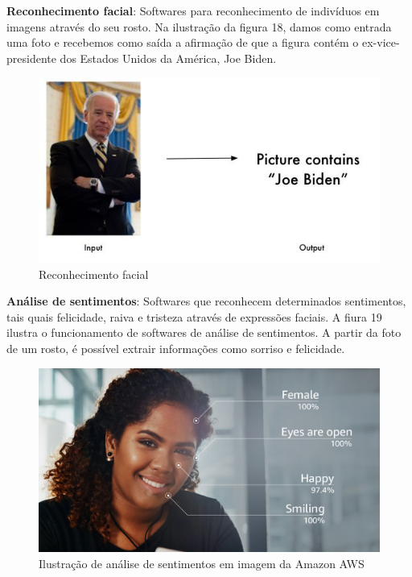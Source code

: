 \documentclass{article}
\begin{document}
\textbf{Reconhecimento facial}: Softwares para reconhecimento de indivíduos em imagens através do seu rosto. Na ilustração da figura 18, damos como entrada uma foto e recebemos como saída a afirmação de que a figura contém o ex-vice-presidente dos Estados Unidos da América, Joe Biden. \\
\begin{figure}[H]
    \centering
    \includegraphics[scale=0.5]{imagens/reconhecimento_facial.jpg}
    \caption{Reconhecimento facial}
    \label{fig:reconhecimento_facial}
\end{figure}{}
\textbf{Análise de sentimentos}: Softwares que reconhecem determinados sentimentos, tais quais felicidade, raiva e tristeza através de expressões faciais. A fiura 19 ilustra o funcionamento de softwares de análise de sentimentos. A partir da foto de um rosto, é possível extrair informações como sorriso e felicidade.\\
\begin{figure}[H]
    \centering
    \includegraphics[scale=0.19]{imagens/analise_facial.jpg}
    \caption{Ilustração de análise de sentimentos em imagem da Amazon AWS}
    \label{fig:imagem_sentimentos}
\end{figure}{}
\end{document}
